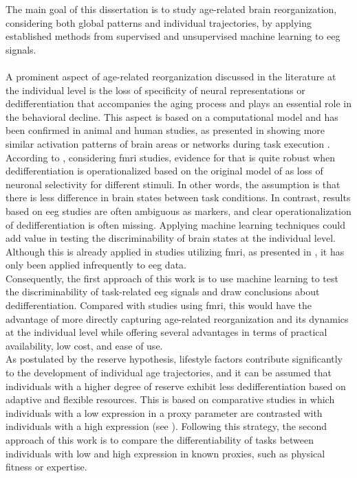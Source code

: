 The main goal of this dissertation is to study age-related brain reorganization, considering both global patterns and individual trajectories, by applying established methods from supervised and unsupervised machine learning to \gls{eeg} signals.\\
\\
A prominent aspect of age-related reorganization discussed in the literature at the individual level is the loss of specificity of neural representations or dedifferentiation that accompanies the aging process and plays an essential role in the behavioral decline. This aspect is based on a computational model and has been confirmed in animal and human studies, as presented in  showing more similar activation patterns of brain areas or networks during task execution \cite{Carb2011, Rieck2021, Antonenko2013, Geerligs2014}. According to \citeauthor{Koen2019}, considering \gls{fmri} studies, evidence for that is quite robust when dedifferentiation is operationalized based on the original model of \citeauthor{Li2001} \cite{Li2001,Li2002} as loss of neuronal selectivity for different stimuli. In other words, the assumption is that there is less difference in brain states between task conditions. In contrast, results based on \gls{eeg} studies are often ambiguous as markers, and clear operationalization of dedifferentiation is often missing. Applying machine learning techniques could add value in testing the discriminability of brain states at the individual level. Although this is already applied in studies utilizing \gls{fmri}, as presented in , it has only been applied infrequently to \gls{eeg} data.\\
Consequently, the first approach of this work is to use machine learning to test the discriminability of task-related \gls{eeg} signals and draw conclusions about dedifferentiation. Compared with studies using \gls{fmri}, this would have the advantage of more directly capturing age-related reorganization and its dynamics at the individual level while offering several advantages in terms of practical availability, low cost, and ease of use.\\
As postulated by the reserve hypothesis, lifestyle factors contribute significantly to the development of individual age trajectories, and it can be assumed that individuals with a higher degree of reserve exhibit less dedifferentiation based on adaptive and flexible resources. This is based on comparative studies in which individuals with a low expression in a proxy parameter are contrasted with individuals with a high expression (see ). Following this strategy, the second approach of this work is to compare the differentiability of tasks between individuals with low and high expression in known proxies, such as physical fitness or expertise.\\
